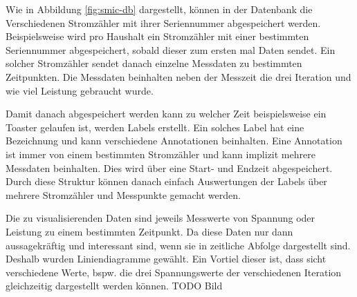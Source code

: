 Wie in Abbildung \ref{fig:smic-db} dargestellt, können in der Datenbank
die Verschiedenen Stromzähler mit ihrer Seriennummer abgespeichert werden.
Beispielsweise wird pro Haushalt ein Stromzähler mit einer bestimmten
Seriennummer abgespeichert, sobald dieser zum ersten mal Daten sendet.
Ein solcher Stromzähler sendet danach einzelne Messdaten zu bestimmten
Zeitpunkten. Die Messdaten beinhalten neben der Messzeit die drei Iteration
und wie viel Leistung gebraucht wurde.

Damit danach abgespeichert werden kann zu welcher Zeit beispielsweise ein
Toaster gelaufen ist, werden Labels erstellt. Ein solches Label hat eine
Bezeichnung und kann verschiedene Annotationen beinhalten.
Eine Annotation ist immer von einem bestimmten Stromzähler und kann implizit mehrere
Messdaten beinhalten. Dies wird über eine Start- und Endzeit abgespeichert.
Durch diese Struktur können danach einfach Auswertungen der Labels über mehrere
Stromzähler und Messpunkte gemacht werden.


Die zu visualisierenden Daten sind jeweils Messwerte von Spannung oder Leistung zu einem bestimmten Zeitpunkt.
Da diese Daten nur dann aussagekräftig und interessant sind, wenn sie in zeitliche Abfolge dargestellt sind.
Deshalb wurden Liniendiagramme gewählt. Ein Vortiel dieser ist, dass sicht verschiedene Werte, bspw. die drei Spannungswerte der verschiedenen Iteration
gleichzeitig dargestellt werden können. TODO Bild


